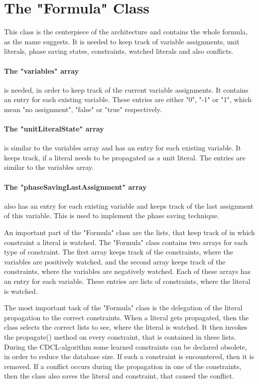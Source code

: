 \section{The "Formula" Class}

This class is the centerpiece of the architecture and contains the whole formula, as the name suggests. It is needed to keep track of variable assignments, unit literals, phase saving states, constraints, watched literals and also conflicts.
\paragraph{The "variables" array} is needed, in order to keep track of the current variable assignments. It contains an entry for each existing variable. These entries are either "0", "-1" or "1", which mean "no assignment", "false" or "true" respectively.
\paragraph{The "unitLiteralState" array} is similar to the variables array and has an entry for each existing variable. It keeps track, if a literal needs to be propagated as a unit literal. The entries are similar to the variables array.
\paragraph{The "phaseSavingLastAssignment" array} also has an entry for each existing variable and keeps track of the last assignment of this variable. This is used to implement the phase saving technique.
\par
An important part of the "Formula" class are the lists, that keep track of in which constraint a literal is watched. The "Formula" class contains two arrays for each type of constraint. The first array keeps track of the constraints, where the variables are positively watched, and the second array keeps track of the constraints, where the variables are negatively watched. Each of these arrays has an entry for each variable. These entries are lists of constraints, where the literal is watched.
\par
The most important task of the "Formula" class is the delegation of the literal propagation to the correct constraints. When a literal gets propagated, then the class selects the correct lists to see, where the literal is watched. It then invokes the propagate() method on every constraint, that is contained in these lists. During the CDCL-algorithm some learned constraints can be declared obsolete, in order to reduce the database size. If such a constraint is encountered, then it is removed. If a conflict occurs during the propagation in one of the constraints, then the class also saves the literal and constraint, that caused the conflict.

